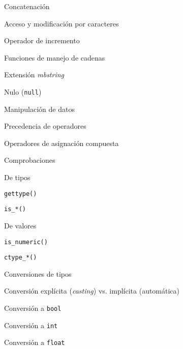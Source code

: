 \begin{longenum}
\begin{longenum}
\begin{longenum}
\begin{longenum}
                \begin{longenum}
                    \item Concatenación
                    \item Acceso y modificación por caracteres
                    \item Operador de incremento \opcional\
                \end{longenum}
                \item Funciones de manejo de cadenas
                \item Extensión \textit{mbstring}
            \end{longenum}
            \item Nulo (\texttt{null})
        \end{longenum}
        \item Manipulación de datos
        \begin{longenum}
            \item Precedencia de operadores
            \item Operadores de asignación compuesta
            \item Comprobaciones
            \begin{longenum}
                \item De tipos
                \begin{longenum}
                    \item \texttt{gettype()}
                    \item \texttt{is\_*()}
                \end{longenum}
                \item De valores
                \begin{longenum}
                    \item \texttt{is\_numeric()}
                    \item \texttt{ctype\_*()}
                \end{longenum}
            \end{longenum}
            \item Conversiones de tipos
            \begin{longenum}
                \item Conversión explícita (\textit{casting}) vs. implícita (automática)
                \item Conversión a \texttt{bool}
                \item Conversión a \texttt{int}
                \item Conversión a \texttt{float}

\end{longenum}
\end{longenum}
\end{longenum}
\end{longenum}
